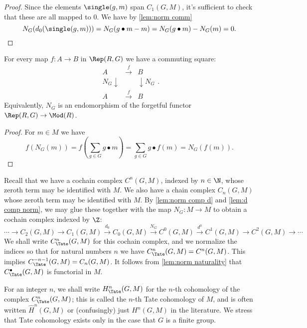 \begin{proof}
	\leanok
	Since the elements $\single(g,m)$ span $C_1(G,M)$, it's sufficient to check
	that these are all mapped to $0$.
	We have by \ref{lem:norm comm}
	\[
		N_G(d_0 (\single(g,m)))
		= N_G( g \bullet m - m)
		=	N_G( g \bullet m) - N_G(m)
		= 0.
	\]
\end{proof}

\begin{lemma} \label{lem:norm naturality}
	\leanok
	For every map $f : A \to B$ in $\Rep(R,G)$ we have a commuting square:
	\[
		\begin{array}{rcl}
			A & \stackrel{f}\to & B \\[2mm]
			N_G\downarrow && \downarrow N_G \\
			A & \stackrel{f}\to & B
		\end{array} .
	\]
	Equivalently, $N_G$ is an endomorphism of the forgetful functor $\Rep(R,G) \to \Mod(R)$.
\end{lemma}

\begin{proof}
	\leanok
	For $m \in M$ we have
	\[
		f(N_G (m))
		= f\left( \sum_{g \in G} g \bullet m\right)
		= \sum_{g \in G} g \bullet f(m)
		= N_G(f(m)).
	\]
\end{proof}

\begin{definition} \label{def:Tate cohomology}
	\leanok
	Recall that we have a cochain complex $C^n(G,M)$, indexed by $n \in \N$,
	whose zeroth term may be identified with $M$.
	We also have a chain complex $C_n(G,M)$ whose zeroth term may be identified with $M$.
	By \ref{lem:norm comp d} and \ref{lem:d comp norm}, we may glue these
	together with the map $N_G : M \to M$ to obtain	a cochain complex indexed by $\Z$:
	\[
		\cdots \to C_2(G,M) \to C_1(G,M) \stackrel{d_0}\to C_0(G,M)
		\stackrel{N_G}\to C^0(G,M) \stackrel{d^0}\to C^1(G,M) \to C^2(G,M) \to \cdots
	\]
	We shall write $C^n_{\Tate}(G,M)$ for this cochain complex,
	and we normalize the indices so that for
	natural numbers $n$ we have $C^n_{\Tate}(G,M) = C^n(G,M)$. This implies
	$C^{-n-1}_{\Tate}(G,M) = C_n(G,M)$.
	It follows from \ref{lem:norm naturality}
	that $C^\bullet_{\Tate}(G,M)$ is functorial in $M$.

	For an integer $n$, we shall write $H^n_{\Tate}(G,M)$ for the $n$-th cohomology of the complex
	$C^n_{\Tate}(G,M)$; this is called the $n$-th Tate cohomology of $M$,
	and is often written $\hat H^n(G,M)$ or (confusingly) just $H^n(G,M)$ in the literature.
	We stress that Tate cohomology exists only in the case that $G$ is a finite group.
\end{definition}

